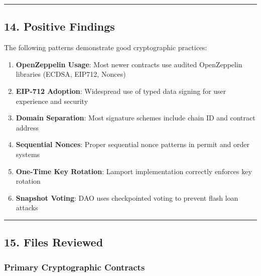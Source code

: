 \documentclass[
]{article}
\providecommand{\tightlist}{%
  \setlength{\itemsep}{0pt}\setlength{\parskip}{0pt}}
\begin{document}
\begin{center}\rule{0.5\linewidth}{0.5pt}\end{center}

\subsection{14. Positive Findings}\label{14-positive-findings}

The following patterns demonstrate good cryptographic practices:

\begin{enumerate}
\def\labelenumi{\arabic{enumi}.}
\tightlist
\item
  \textbf{OpenZeppelin Usage}: Most newer contracts use audited
  OpenZeppelin libraries (ECDSA, EIP712, Nonces)
\item
  \textbf{EIP-712 Adoption}: Widespread use of typed data signing for
  user experience and security
\item
  \textbf{Domain Separation}: Most signature schemes include chain ID
  and contract address
\item
  \textbf{Sequential Nonces}: Proper sequential nonce patterns in permit
  and order systems
\item
  \textbf{One-Time Key Rotation}: Lamport implementation correctly
  enforces key rotation
\item
  \textbf{Snapshot Voting}: DAO uses checkpointed voting to prevent
  flash loan attacks
\end{enumerate}

\begin{center}\rule{0.5\linewidth}{0.5pt}\end{center}

\subsection{15. Files Reviewed}\label{15-files-reviewed}

\subsubsection{Primary Cryptographic
Contracts}\label{primary-cryptographic-contracts}
\end{document}
